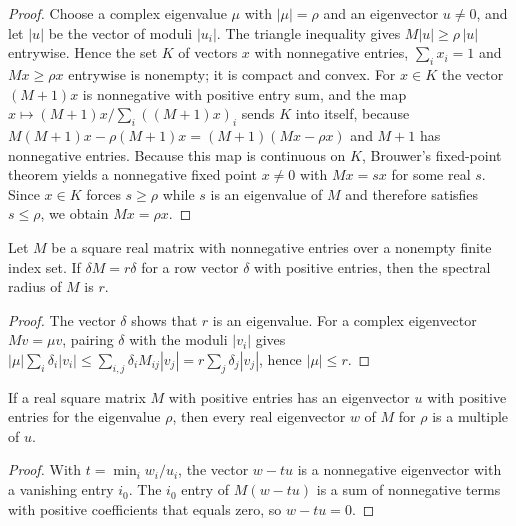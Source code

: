\begin{proof}\leanok
    Choose a complex eigenvalue $\mu$ with $|\mu|=\rho$ and
    an eigenvector $u\neq0$, and let $|u|$ be the vector of moduli
    $|u_i|$. The triangle inequality gives $M|u|\geq\rho\,|u|$ entrywise.
    Hence the set $K$ of vectors $x$ with nonnegative entries,
    $\sum_ix_i=1$ and $Mx\geq\rho x$ entrywise is nonempty; it is compact
    and convex. For $x\in K$ the vector $(M+1)x$ is nonnegative with
    positive entry sum, and the map
    $x\mapsto(M+1)x/\sum_i((M+1)x)_i$ sends $K$ into itself, because
    $M(M+1)x-\rho(M+1)x=(M+1)(Mx-\rho x)$ and $M+1$ has nonnegative
    entries. Because this map is continuous on $K$, Brouwer's fixed-point
    theorem yields a nonnegative fixed point $x\neq0$ with $Mx=sx$ for some
    real $s$. Since $x\in K$ forces $s\geq\rho$ while $s$ is an eigenvalue
    of $M$ and therefore satisfies $s\leq\rho$, we obtain $Mx=\rho x$.
\end{proof}

\begin{lemma}
    \label{lem:spectral_radius_positive_left_eigenvector}
    \leanok
    Let $M$ be a square real matrix with nonnegative entries over a nonempty
    finite index set. If $\delta M=r\delta$ for a row vector $\delta$ with
    positive entries, then the spectral radius of $M$ is $r$.
\end{lemma}

\begin{proof}\leanok
    The vector $\delta$ shows that $r$ is an eigenvalue. For a complex
    eigenvector $Mv=\mu v$, pairing $\delta$ with the moduli $|v_i|$ gives
    $|\mu|\sum_i\delta_i|v_i|\le\sum_{i,j}\delta_iM_{ij}|v_j|=r\sum_j\delta_j|v_j|$,
    hence $|\mu|\le r$.
\end{proof}

\begin{lemma}
    \label{lem:positive_eigenvector_unique}
    \leanok
    If a real square matrix $M$ with positive entries has an eigenvector $u$
    with positive entries for the eigenvalue $\rho$, then every real
    eigenvector $w$ of $M$ for $\rho$ is a multiple of $u$.
\end{lemma}

\begin{proof}\leanok
    With $t=\min_iw_i/u_i$, the vector $w-tu$ is a nonnegative eigenvector
    with a vanishing entry $i_0$. The $i_0$ entry of $M(w-tu)$ is a sum of
    nonnegative terms with positive coefficients that equals zero, so
    $w-tu=0$.
\end{proof}
